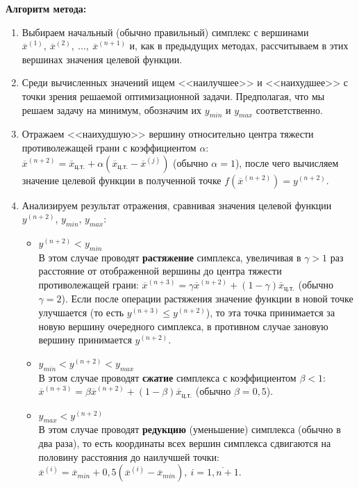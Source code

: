 \documentclass[a4paper,12pt]{report}
\begin{document}
\textbf{Алгоритм метода:}
\begin{enumerate}
\item Выбираем начальный (обычно правильный) симплекс с вершинами $\overline{x}^{(1)},\ \overline{x}^{(2)},\ \ldots,\ \overline{x}^{(n+1)}$ и, как в предыдущих методах, рассчитываем в этих вершинах значения целевой функции.
\item Среди вычисленных значений ищем <<наилучшее>> и <<наихудшее>> с точки зрения решаемой оптимизационной задачи. Предполагая, что мы решаем задачу на минимум, обозначим их $y_{min}$ и $y_{max}$ соответственно.
\item Отражаем <<наихудшую>> вершину относительно центра тяжести противолежащей грани с коэффициентом $\alpha$: $\overline{x}^{(n+2)} = \overline{x}_{\text{ц.т.}} + \alpha(\overline{x}_{\text{ц.т.}} - \overline{x}^{(j)})$ (обычно $\alpha = 1$), после чего вычисляем значение целевой функции в полученной точке $f(\overline{x}^{(n+2)}) = y^{(n+2)}$.
\item Анализируем результат отражения, сравнивая значения целевой функции $y^{(n+2)}$, $y_{min}$, $y_{max}$:
\begin{itemize}
\item $y^{(n+2)} < y_{min}$\\
В этом случае проводят \textbf{растяжение} симплекса, увеличивая в $\gamma > 1$ раз расстояние от отображенной вершины до центра тяжести противолежащей грани: $\overline{x}^{(n+3)} = \gamma\overline{x}^{(n+2)} + (1 - \gamma)\overline{x}_{\text{ц.т.}}$ (обычно $\gamma = 2$). Если после операции растяжения значение функции в новой точке улучшается (то есть $y^{(n+3)} \leq y^{(n+2)}$), то эта точка принимается за новую вершину очередного симплекса, в противном случае зановую вершину принимается $y^{(n+2)}$.
\item $y_{min} < y^{(n+2)} < y_{max}$\\
В этом случае проводят \textbf{сжатие} симплекса с коэффициентом $\beta < 1$: $\overline{x}^{(n+3)} = \beta\overline{x}^{(n+2)} + (1 - \beta)\overline{x}_{\text{ц.т.}}$ (обычно $\beta = 0,5$).
\item $y_{max} < y^{(n+2)}$\\
В этом случае проводят \textbf{редукцию} (уменьшение) симплекса (обычно в два раза), то есть координаты всех вершин симплекса сдвигаются на половину расстояния до наилучшей точки: $\overline{x}^{(i)} = \overline{x}_{min} + 0,5(\overline{x}^{(i)} - \overline{x}_{min}),\ i=\overline{1,n+1}$.
\end{itemize}
\end{enumerate}
\end{document}
